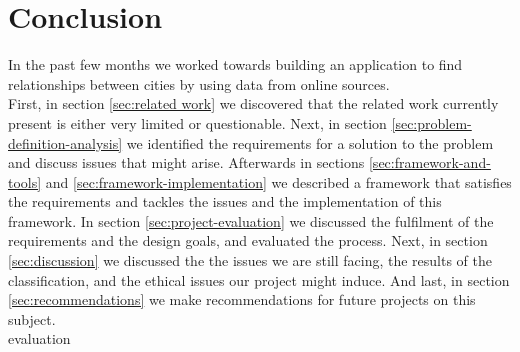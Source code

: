 \chapter{Conclusion}
In the past few months we worked towards building an application to find relationships between cities by using data from online sources.  \\


First, in section \ref{sec:related work} we discovered that the related work currently present is either very limited or questionable. Next, in section \ref{sec:problem-definition-analysis} we identified the requirements for a solution to the problem and discuss issues that might arise. Afterwards in sections \ref{sec:framework-and-tools} and \ref{sec:framework-implementation} we described a framework that satisfies the requirements and tackles the issues and the implementation of this framework. In section \ref{sec:project-evaluation} we discussed the fulfilment of the requirements and the design goals, and evaluated the process. Next, in section \ref{sec:discussion} we discussed the the issues we are still facing, the results of the classification, and the ethical issues our project might induce. And last, in section \ref{sec:recommendations} we make recommendations for future projects on this subject. \\

evaluation \\




